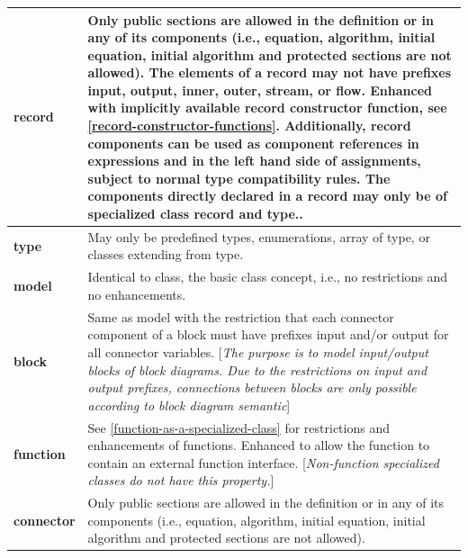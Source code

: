 \documentclass[10pt,a4paper]{report}
\begin{document}
\begin{longtable}{|p{4cm}|p{9cm}|} 
\hline
\textbf{record} & Only public sections are allowed in the definition or
in any of its components (i.e., equation, algorithm, initial equation,
initial algorithm and protected sections are not allowed). The elements
of a record may not have prefixes input, output, inner, outer, stream,
or flow. Enhanced with implicitly available record constructor function,
see \ref{record-constructor-functions}. Additionally, record components can be used as
component references in expressions and in the left hand side of
assignments, subject to normal type compatibility rules. The components
directly declared in a record may only be of specialized class record
and type..\\ \hline
\textbf{type} & May only be predefined types, enumerations, array of
type, or classes extending from type.\\ \hline
\textbf{model} & Identical to class, the basic class concept, i.e., no
restrictions and no enhancements.\\ \hline
\textbf{block} & Same as model with the restriction that each connector
component of a block must have prefixes input and/or output for all
connector variables. {[}\emph{The purpose is to model input/output
blocks of block diagrams. Due to the restrictions on input and output
prefixes, connections between blocks are only possible according to
block diagram semantic}{]}\\ \hline
\textbf{function} & See \ref{function-as-a-specialized-class} for restrictions
and enhancements of functions. Enhanced to allow the
function to contain an external function interface.
{[}\emph{Non-function specialized classes do not have this
property.}{]}\\ \hline
\textbf{connector} & Only public sections are allowed in the definition or in any of its
components (i.e., equation, algorithm, initial equation, initial
algorithm and protected sections are not allowed).


\end{longtable}
\end{document}
